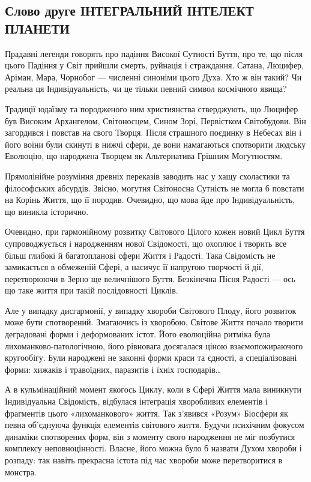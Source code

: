  
 

\subsection{Слово друге ІНТЕГРАЛЬНИЙ ІНТЕЛЕКТ ПЛАНЕТИ}

Прадавні легенди говорять про падіння Високої Сутності Буття, про те, що після
цього Падіння у Світ прийшли смерть, руйнація і страждання. Сатана, Люцифер,
Аріман, Мара, Чорнобог — численні синоніми цього Духа. Хто ж він такий? Чи
реальна ця Індивідуальність, чи це тільки певний символ космічного явища?

Традиції юдаїзму та породженого ним християнства стверджують, що Люцифер був
Високим Архангелом, Світоносцем, Сином Зорі, Первістком Світобудови. Він
загордився і повстав на свого Творця. Після страшного поєдинку в Небесах він і
його воїни були скинуті в нижчі сфери, де вони намагаються спотворити людську
Еволюцію, що народжена Творцем як Альтернатива Грішним Могутностям.

Прямолінійне розуміння древніх переказів заводить нас у хащу схоластики та
філософських абсурдів. Звісно, могутня Світоносна Сутність не могла б повстати
на Корінь Життя, що її породив. Очевидно, що мова йде про Індивідуальність, що
виникла історично.

Очевидно, при гармонійному розвитку Світового Цілого кожен новий Цикл Буття
супроводжується і народженням нової Свідомості, що охоплює і творить все більш
глибокі й багатопланові сфери Життя і Радості. Така Свідомість не замикається в
обмеженій Сфері, а насичує її напругою творчості й дії, перетворюючи в Зерно ще
величнішого Буття. Безкінечна Пісня Радості — ось що таке життя при такій
послідовності Циклів.

Але у випадку дисгармонії, у випадку хвороби Світового Плоду, його розвиток
може бути спотворений. Змагаючись із хворобою, Світове Життя почало творити
деградовані форми і деформованих істот. Його еволюційна ритміка була
лихоманково-патологічною, його рівновага досягалася ціною взаємопожираючого
кругообігу. Були народжені не законні форми краси та єдності, а спеціалізовані
форми: хижаків і травоїдних, паразитів і їхніх господарів…

А в кульмінаційний момент якогось Циклу, коли в Сфері Життя мала виникнути
Індивідуальна Свідомість, відбулася інтеграція хворобливих елементів і
фрагментів цього «лихоманкового» життя. Так з’явився «Розум» Біосфери як певна
об’єднуюча функція елементів світового життя. Будучи психічним фокусом динаміки
спотворених форм, він з моменту свого народження не міг позбутися комплексу
неповноцінності. Власне, його можна було б назвати Духом хвороби і розпаду: так
навіть прекрасна істота під час хвороби може перетворитися в монстра.

